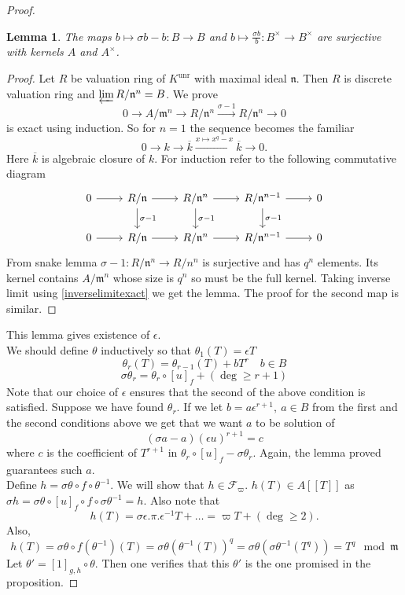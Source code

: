 \documentclass[twoside, 12pt]{iiser-thesis}
\newtheorem{lem}[thm]{ Lemma}
\newcommand{\x}{\times}
\newcommand{\un}{\text{unr}}
\begin{document}
\begin{proof}
\begin{lem}
The maps $b\mapsto \sigma b -b:B \rightarrow B$ and  $b\mapsto \frac{\sigma b}{b}:B^\times \rightarrow B^\times $  are surjective with kernels $A$ and $ A^\x$.
\end{lem}
\begin{proof}
Let $R$ be valuation ring of $K^\un$ with maximal ideal  $\mathfrak n$. Then $R$ is discrete valuation ring and $\varprojlim R/\mathfrak n ^n = B$. We prove $$0 \rightarrow A/\mathfrak m ^n \rightarrow R/\mathfrak n^n \xrightarrow{\sigma -1} R / \mathfrak n^n \rightarrow 0$$ is exact using induction. So for $n=1$ the sequence becomes the familiar $$ 0 \rightarrow k \rightarrow \overline k \xrightarrow{x \mapsto x^q-x} \overline k \rightarrow 0.$$
Here $\overline k$ is algebraic closure of $k$. For induction refer to the following commutative diagram 
\[
\begin{tikzcd}
0 \arrow[r] & R/\mathfrak n \arrow[r] \arrow[d , "\sigma -1"] & R/\mathfrak n^n \arrow[r] \arrow[d, "\sigma -1"] & R/\mathfrak n^{n-1} \arrow[r] \arrow[d, "\sigma -1"] & 0 \\
0 \arrow[r] & R/\mathfrak n \arrow[r] & R/ \mathfrak n ^n \arrow[r] & R/\mathfrak n ^{n-1} \arrow[r] & 0
\end{tikzcd}
\]
From snake lemma $\sigma -1: R/\mathfrak n^n \rightarrow R/ n ^n$ is surjective and has $q^n$ elements. Its kernel contains $A/\mathfrak m ^n$ whose size is $q^n$ so must be the full kernel. Taking inverse limit using \cref{inverselimitexact} we get the lemma. The proof for the second map is similar.
\end{proof}
This lemma gives existence of $\epsilon$. \\
We should define $\theta$ inductively so that  $\theta _1(T) = \epsilon T$ \[\theta _r(T) = \theta _{r-1} (T) + b T^r \quad b \in B\]
\[ \sigma \theta _r = \theta _r \circ [u]_f + ( \deg \geq r+1) \]
Note that our choice of $\epsilon $ ensures that the second of the above condition is satisfied. Suppose we have found $\theta _r$. If we let $b= a\epsilon ^{r+1}, \ a\in B$ from the first and the second conditions above we get that we want $a$ to be solution of \[ (\sigma a -a )(\epsilon u) ^{r+1} =c\] where $c$ is the coefficient of $T^{r+1}$ in $\theta _r \circ [u]_f - \sigma \theta _r$. Again, the lemma proved guarantees such $a$. \\
Define $h= \sigma \theta \circ f\circ \theta ^{-1}$. We will show that $h \in \mathcal F _\varpi$. 
$h(T) \in A[[T]]$ as $\sigma h = \sigma \theta \circ [u]_f \circ f \circ \sigma \theta ^{-1} = h$. Also note that \[h(T)= \sigma \epsilon . \pi. \epsilon ^{-1} T + \dots = \varpi T + (\deg \geq 2).\] Also,
\[ h(T)= \sigma \theta \circ f (\theta ^{-1}) (T) = \sigma \theta (\theta ^{-1}(T))^q = \sigma \theta (\sigma \theta ^{-1} (T^q)) =T^q \mod \mathfrak m\] 
Let $\theta ' = [1]_{g,h} \circ \theta$. Then one verifies that this $\theta '$ is the one promised in the proposition.
 \end{proof}
\end{document}
